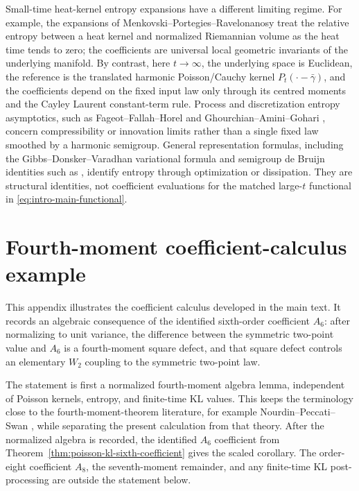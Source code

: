 Small-time heat-kernel entropy expansions have a different limiting regime.
For example, the expansions of
Menkovski--Portegies--Ravelonanosy
\cite{MenkovskiPortegiesRavelonanosy2024HeatKernelEntropy} treat the
relative entropy between a heat kernel and normalized Riemannian volume as the
heat time tends to zero; the coefficients are universal local geometric
invariants of the underlying manifold.  By contrast, here \(t\to\infty\), the
underlying space is Euclidean, the reference is the translated harmonic
Poisson/Cauchy kernel \(P_t(\cdot-\bar\gamma)\), and the coefficients depend
on the fixed input law only through its centred moments and the Cayley Laurent
constant-term rule.  Process and discretization entropy asymptotics, such as
Fageot--Fallah--Horel
\cite{FageotFallahHorel2022EntropicCompressibilityLevy} and
Ghourchian--Amini--Gohari
\cite{GhourchianAminiGohari2018InnovationCompressibility}, concern
compressibility or innovation limits rather than a single fixed law smoothed
by a harmonic semigroup.  General representation formulas, including the
Gibbs--Donsker--Varadhan variational formula
\cite{DonskerVaradhan1975AsymptoticI,DupuisEllis1997WeakConvergence} and
semigroup de Bruijn identities such as
\cite{DeBruijn1953,HirataNemotoYoshida2012IntegralRepresentation,
Yoshida2017RelativeEntropyDiffusion}, identify entropy through optimization
or dissipation.  They are structural identities, not coefficient evaluations
for the matched large-\(t\) functional in
\eqref{eq:intro-main-functional}.

\section{Fourth-moment coefficient-calculus example}%
\label{app:optional-fourth-moment-coefficient-algebra}
\label{subsec:coefficient-defect-coupling}
\label{subsec:fourth-moment-stability}

This appendix illustrates the coefficient calculus developed in the main
text.  It records an algebraic consequence of the identified sixth-order
coefficient \(A_6\): after normalizing to unit variance, the difference
between the symmetric two-point value and \(A_6\) is a fourth-moment square
defect, and that square defect controls an elementary \(W_2\) coupling to the
symmetric two-point law.

The statement is first a normalized fourth-moment algebra lemma, independent
of Poisson kernels, entropy, and finite-time KL values.  This keeps the
terminology close to the fourth-moment-theorem literature, for example
Nourdin--Peccati--Swan
\cite{NourdinPeccatiSwan2014EntropyFourthMoment}, while separating the
present calculation from that theory.  After the normalized algebra is
recorded, the identified \(A_6\) coefficient from
Theorem~\ref{thm:poisson-kl-sixth-coefficient} gives the scaled corollary.
The order-eight coefficient \(A_8\), the seventh-moment remainder, and any
finite-time KL post-processing are outside the statement below.

